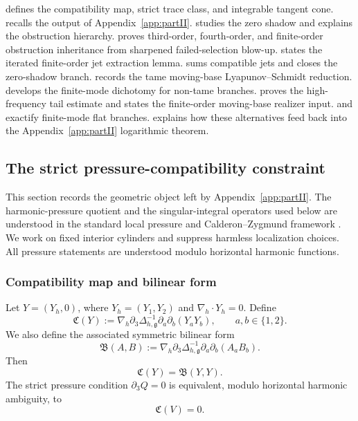 \documentclass[11pt]{article}
\numberwithin{equation}{section}
\theoremstyle{plain}
\theoremstyle{definition}
\theoremstyle{remark}
\newcommand{\nabh}{\nabla_h}
\newcommand{\divh}{\nabla_h\!\cdot}
\newcommand{\calB}{\mathfrak B}
\newcommand{\calC}{\mathfrak C}
\begin{document}
 defines the compatibility map, strict trace class, and integrable
tangent cone.   recalls the output of Appendix~\ref{app:partII}.  
studies the zero shadow and explains the obstruction hierarchy.  
proves third-order, fourth-order, and finite-order obstruction inheritance from sharpened
failed-selection blow-up.   states the iterated finite-order jet
extraction lemma.   sums compatible jets and closes the zero-shadow
branch.   records the tame moving-base Lyapunov--Schmidt
reduction.   develops the finite-mode dichotomy for
non-tame branches.   proves the high-frequency tail
estimate and states the finite-order moving-base realizer input.  
and  exactify finite-mode flat branches.
 explains how these alternatives feed back into the Appendix~\ref{app:partII}
logarithmic theorem.

\subsection{The strict pressure-compatibility constraint}\label{pIII:sec:constraint}

This section records the geometric object left by Appendix~\ref{app:partII}.  The harmonic-pressure quotient
and the singular-integral operators used below are understood in the standard local pressure
and Calderon--Zygmund framework \cite{Stein1970,Seregin2015,Wolf2017}.  We work on fixed interior
cylinders and suppress harmless localization choices.  All pressure statements are
understood modulo horizontal harmonic functions.

\subsubsection{Compatibility map and bilinear form}

Let \(Y=(Y_h,0)\), where \(Y_h=(Y_1,Y_2)\) and \(\divh Y_h=0\).  Define
\begin{equation}\label{pIII:eq:Cmap}
        \calC(Y)
        :=
        \nabh\partial_3\Delta_{h,\mathfrak g}^{-1}
        \partial_a\partial_b(Y_aY_b),
        \qquad a,b\in\{1,2\}.
\end{equation}
We also define the associated symmetric bilinear form
\begin{equation}\label{pIII:eq:Bmap}
        \calB(A,B)
        :=
        \nabh\partial_3\Delta_{h,\mathfrak g}^{-1}
        \partial_a\partial_b(A_aB_b).
\end{equation}
Then
\begin{equation}\label{pIII:eq:CequalsB}
        \calC(Y)=\calB(Y,Y).
\end{equation}
The strict pressure condition \(\partial_3Q=0\) is equivalent, modulo horizontal
harmonic ambiguity, to
\begin{equation}\label{pIII:eq:zero-set}
        \calC(V)=0.
\end{equation}
\end{document}
